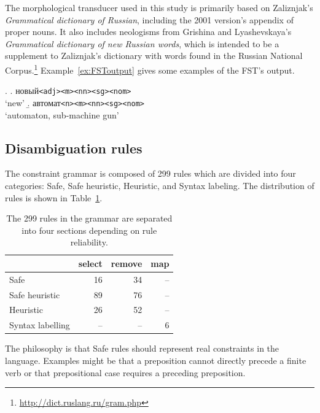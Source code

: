 \documentclass[11pt]{article}
\newcommand{\rus}[1]{\foreignlanguage{russian}{#1}}
\begin{document}
The morphological transducer used in this study is 
primarily based on Zaliznjak's \emph{Grammatical dictionary of Russian}, 
including the 2001 version's appendix of proper nouns. It also includes neologisms
from Grishina and Lyashevskaya's \emph{Grammatical dictionary of new Russian words},
which is intended to be a supplement to Zaliznjak's dictionary with words found in
the Russian National Corpus.\footnote{\url{http://dict.ruslang.ru/gram.php}} 
Example~\ref{ex:FSToutput} gives some examples of the FST's output.

\ex. \label{ex:FSToutput} 
	\a. \rus{новый}\texttt{{\small <adj><m><nn><sg><nom>}}\\
	    `new'
	\b. \rus{автомат}\texttt{{<m><nn><sg><nom>}}\\
	    `automaton, sub-machine gun'

\subsection{Disambiguation rules}

The constraint grammar is composed of 299 rules which are divided into four
categories: Safe, Safe heuristic, Heuristic, and Syntax labeling. The distribution
of rules is shown in Table~\ref{tab:ruleDist}.

\begin{table}
  \centering
  \begin{tabular}{lrrr}
    \hline
                     & {\sc select} & {\sc remove} & {\sc map} \\
    \hline
    Safe             &   16         &   34         &  -- \\
    Safe heuristic   &   89         &   76         &  -- \\
    Heuristic        &   26         &   52         &  -- \\
    Syntax labelling & --           & --           & 6 \\ 
    \hline
  \end{tabular}
  \caption{The 299 rules in the grammar are separated into four sections depending
      on rule reliability. }
  \label{tab:ruleDist}
\end{table}

The philosophy is that Safe rules should represent real constraints in
the language. Examples might be that a preposition cannot directly precede a finite verb
or that prepositional case requires a preceding preposition. 
\end{document}
